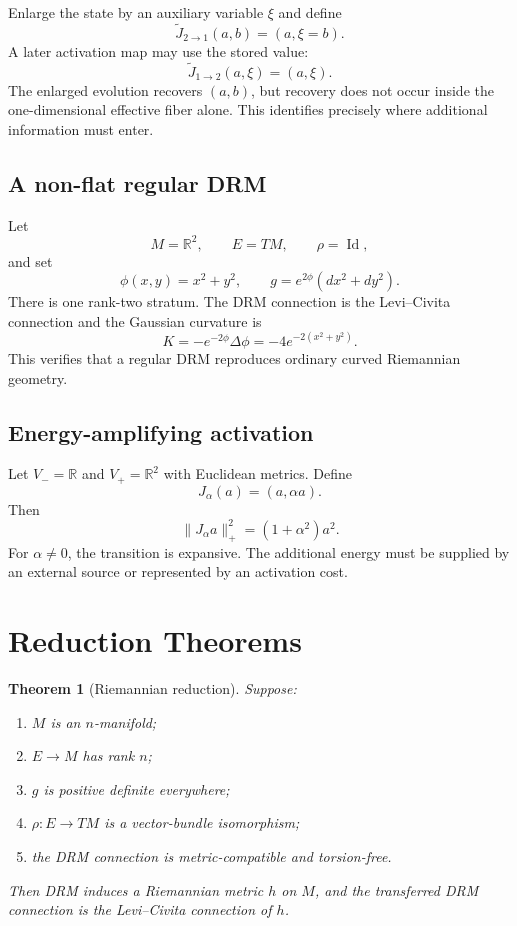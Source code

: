 \documentclass[11pt]{article}
\newtheorem{theorem}{Theorem}[section]
\newcommand{\R}{\mathbb{R}}
\newcommand{\Id}{\operatorname{Id}}
\begin{document}
Enlarge the state by an auxiliary variable $\xi$ and define
\[
\widetilde J_{2\to1}(a,b)=(a,\xi=b).
\]
A later activation map may use the stored value:
\[
\widetilde J_{1\to2}(a,\xi)=(a,\xi).
\]
The enlarged evolution recovers $(a,b)$, but recovery does not occur inside
the one-dimensional effective fiber alone. This identifies precisely where
additional information must enter.

\subsection{A non-flat regular DRM}

Let
\[
M=\R^2,
\qquad
E=TM,
\qquad
\rho=\Id,
\]
and set
\[
\phi(x,y)=x^2+y^2,
\qquad
g=e^{2\phi}(dx^2+dy^2).
\]
There is one rank-two stratum. The DRM connection is the Levi--Civita
connection and the Gaussian curvature is
\[
K=-e^{-2\phi}\Delta\phi
=-4e^{-2(x^2+y^2)}.
\]
This verifies that a regular DRM reproduces ordinary curved Riemannian
geometry.

\subsection{Energy-amplifying activation}

Let $V_-=\R$ and $V_+=\R^2$ with Euclidean metrics. Define
\[
J_\alpha(a)=(a,\alpha a).
\]
Then
\[
\|J_\alpha a\|_+^2=(1+\alpha^2)a^2.
\]
For $\alpha\ne0$, the transition is expansive. The additional energy must be
supplied by an external source or represented by an activation cost.

\section{Reduction Theorems}
\label{sec:reductions}

\begin{theorem}[Riemannian reduction]
Suppose:
\begin{enumerate}[label=(\roman*)]
\item $M$ is an $n$-manifold;
\item $E\to M$ has rank $n$;
\item $g$ is positive definite everywhere;
\item $\rho:E\to TM$ is a vector-bundle isomorphism;
\item the DRM connection is metric-compatible and torsion-free.
\end{enumerate}
Then DRM induces a Riemannian metric $h$ on $M$, and the transferred DRM
connection is the Levi--Civita connection of $h$.
\end{theorem}
\end{document}
